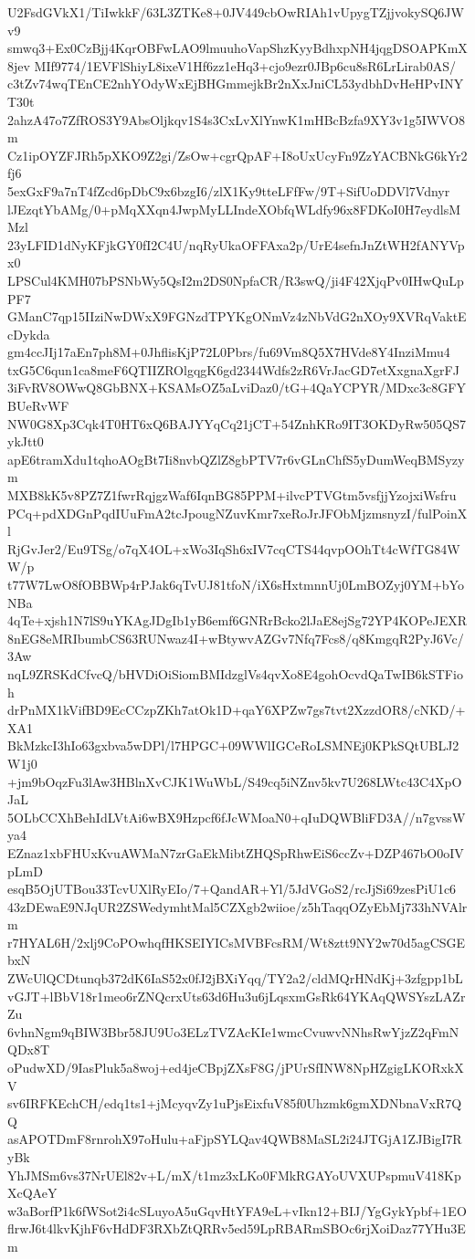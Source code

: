 U2FsdGVkX1/TiIwkkF/63L3ZTKe8+0JV449cbOwRIAh1vUpygTZjjvokySQ6JWv9
smwq3+Ex0CzBjj4KqrOBFwLAO9lmuuhoVapShzKyyBdhxpNH4jqgDSOAPKmX8jev
MIf9774/1EVFlShiyL8ixeV1Hf6zz1eHq3+cjo9ezr0JBp6cu8sR6LrLirab0AS/
c3tZv74wqTEnCE2nhYOdyWxEjBHGmmejkBr2nXxJniCL53ydbhDvHeHPvINYT30t
2ahzA47o7ZfROS3Y9AbsOljkqv1S4s3CxLvXlYnwK1mHBcBzfa9XY3v1g5IWVO8m
Cz1ipOYZFJRh5pXKO9Z2gi/ZsOw+cgrQpAF+I8oUxUcyFn9ZzYACBNkG6kYr2fj6
5exGxF9a7nT4fZcd6pDbC9x6bzgI6/zlX1Ky9tteLFfFw/9T+SifUoDDVl7Vdnyr
lJEzqtYbAMg/0+pMqXXqn4JwpMyLLIndeXObfqWLdfy96x8FDKoI0H7eydlsMMzl
23yLFID1dNyKFjkGY0fI2C4U/nqRyUkaOFFAxa2p/UrE4sefnJnZtWH2fANYVpx0
LPSCul4KMH07bPSNbWy5QsI2m2DS0NpfaCR/R3swQ/ji4F42XjqPv0IHwQuLpPF7
GManC7qp15IIziNwDWxX9FGNzdTPYKgONmVz4zNbVdG2nXOy9XVRqVaktEcDykda
gm4ccJIj17aEn7ph8M+0JhflisKjP72L0Pbrs/fu69Vm8Q5X7HVde8Y4InziMmu4
txG5C6qun1ca8meF6QTIIZROlgqgK6gd2344Wdfs2zR6VrJacGD7etXxgnaXgrFJ
3iFvRV8OWwQ8GbBNX+KSAMsOZ5aLviDaz0/tG+4QaYCPYR/MDxc3c8GFYBUeRvWF
NW0G8Xp3Cqk4T0HT6xQ6BAJYYqCq21jCT+54ZnhKRo9IT3OKDyRw505QS7ykJtt0
apE6tramXdu1tqhoAOgBt7Ii8nvbQZlZ8gbPTV7r6vGLnChfS5yDumWeqBMSyzym
MXB8kK5v8PZ7Z1fwrRqjgzWaf6IqnBG85PPM+ilvcPTVGtm5vsfjjYzojxiWsfru
PCq+pdXDGnPqdIUuFmA2tcJpougNZuvKmr7xeRoJrJFObMjzmsnyzI/fulPoinXl
RjGvJer2/Eu9TSg/o7qX4OL+xWo3IqSh6xIV7cqCTS44qvpOOhTt4cWfTG84WW/p
t77W7LwO8fOBBWp4rPJak6qTvUJ81tfoN/iX6sHxtmnnUj0LmBOZyj0YM+bYoNBa
4qTe+xjsh1N7lS9uYKAgJDgIb1yB6emf6GNRrBcko2lJaE8ejSg72YP4KOPeJEXR
8nEG8eMRIbumbCS63RUNwaz4I+wBtywvAZGv7Nfq7Fcs8/q8KmgqR2PyJ6Vc/3Aw
nqL9ZRSKdCfvcQ/bHVDiOiSiomBMIdzglVs4qvXo8E4gohOcvdQaTwIB6kSTFioh
drPnMX1kVifBD9EcCCzpZKh7atOk1D+qaY6XPZw7gs7tvt2XzzdOR8/cNKD/+XA1
BkMzkcI3hIo63gxbva5wDPl/l7HPGC+09WWlIGCeRoLSMNEj0KPkSQtUBLJ2W1j0
+jm9bOqzFu3lAw3HBlnXvCJK1WuWbL/S49cq5iNZnv5kv7U268LWtc43C4XpOJaL
5OLbCCXhBehIdLVtAi6wBX9Hzpcf6fJcWMoaN0+qIuDQWBliFD3A//n7gvssWya4
EZnaz1xbFHUxKvuAWMaN7zrGaEkMibtZHQSpRhwEiS6ccZv+DZP467bO0oIVpLmD
esqB5OjUTBou33TcvUXlRyEIo/7+QandAR+Yl/5JdVGoS2/rcJjSi69zesPiU1c6
43zDEwaE9NJqUR2ZSWedymhtMal5CZXgb2wiioe/z5hTaqqOZyEbMj733hNVAlrm
r7HYAL6H/2xlj9CoPOwhqfHKSEIYICsMVBFcsRM/Wt8ztt9NY2w70d5agCSGEbxN
ZWcUlQCDtunqb372dK6IaS52x0fJ2jBXiYqq/TY2a2/cldMQrHNdKj+3zfgpp1bL
vGJT+lBbV18r1meo6rZNQcrxUts63d6Hu3u6jLqsxmGsRk64YKAqQWSYszLAZrZu
6vhnNgm9qBIW3Bbr58JU9Uo3ELzTVZAcKIe1wmcCvuwvNNhsRwYjzZ2qFmNQDx8T
oPudwXD/9IasPluk5a8woj+ed4jeCBpjZXsF8G/jPUrSfINW8NpHZgigLKORxkXV
sv6IRFKEchCH/edq1ts1+jMcyqvZy1uPjsEixfuV85f0Uhzmk6gmXDNbnaVxR7QQ
asAPOTDmF8rnrohX97oHulu+aFjpSYLQav4QWB8MaSL2i24JTGjA1ZJBigI7RyBk
YhJMSm6vs37NrUEl82v+L/mX/t1mz3xLKo0FMkRGAYoUVXUPspmuV418KpXcQAeY
w3aBorfP1k6fWSot2i4cSLuyoA5uGqvHtYFA9eL+vIkn12+BIJ/YgGykYpbf+1EO
flrwJ6t4lkvKjhF6vHdDF3RXbZtQRRv5ed59LpRBARmSBOc6rjXoiDaz77YHu3Em
